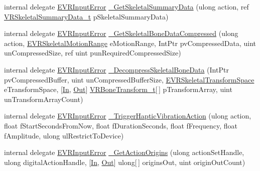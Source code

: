 \begin{DoxyCompactItemize}
\item 
internal delegate \mbox{\hyperlink{namespace_valve_1_1_v_r_a592d7f4189b8346d6c96dbdbaa35bc1b}{E\+V\+R\+Input\+Error}} \mbox{\hyperlink{struct_valve_1_1_v_r_1_1_i_v_r_input_ae852c5f41c5b1d36119e74ee6dbad779}{\+\_\+\+Get\+Skeletal\+Summary\+Data}} (ulong action, ref \mbox{\hyperlink{struct_valve_1_1_v_r_1_1_v_r_skeletal_summary_data__t}{V\+R\+Skeletal\+Summary\+Data\+\_\+t}} p\+Skeletal\+Summary\+Data)
\item 
internal delegate \mbox{\hyperlink{namespace_valve_1_1_v_r_a592d7f4189b8346d6c96dbdbaa35bc1b}{E\+V\+R\+Input\+Error}} \mbox{\hyperlink{struct_valve_1_1_v_r_1_1_i_v_r_input_ac9cf8a486d0d66c088c2eb33b722111d}{\+\_\+\+Get\+Skeletal\+Bone\+Data\+Compressed}} (ulong action, \mbox{\hyperlink{namespace_valve_1_1_v_r_affc8d18345f8f5d36f1ae7b4ce534500}{E\+V\+R\+Skeletal\+Motion\+Range}} e\+Motion\+Range, Int\+Ptr pv\+Compressed\+Data, uint un\+Compressed\+Size, ref uint pun\+Required\+Compressed\+Size)
\item 
internal delegate \mbox{\hyperlink{namespace_valve_1_1_v_r_a592d7f4189b8346d6c96dbdbaa35bc1b}{E\+V\+R\+Input\+Error}} \mbox{\hyperlink{struct_valve_1_1_v_r_1_1_i_v_r_input_ae399aa93e9fa3f84762ce5e124b7c6fb}{\+\_\+\+Decompress\+Skeletal\+Bone\+Data}} (Int\+Ptr pv\+Compressed\+Buffer, uint un\+Compressed\+Buffer\+Size, \mbox{\hyperlink{namespace_valve_1_1_v_r_a916744fb3fc7b8e8ba224fba9bee6de4}{E\+V\+R\+Skeletal\+Transform\+Space}} e\+Transform\+Space, \mbox{[}\mbox{\hyperlink{namespace_valve_1_1_v_r_a1e6192cb5ddaf204afab87ccb5728780aefeb369cccbd560588a756610865664c}{In}}, \mbox{\hyperlink{namespace_valve_1_1_v_r_a1e6192cb5ddaf204afab87ccb5728780a7c147cda9e49590f6abe83d118b7353b}{Out}}\mbox{]} \mbox{\hyperlink{struct_valve_1_1_v_r_1_1_v_r_bone_transform__t}{V\+R\+Bone\+Transform\+\_\+t}}\mbox{[}$\,$\mbox{]} p\+Transform\+Array, uint un\+Transform\+Array\+Count)
\item 
internal delegate \mbox{\hyperlink{namespace_valve_1_1_v_r_a592d7f4189b8346d6c96dbdbaa35bc1b}{E\+V\+R\+Input\+Error}} \mbox{\hyperlink{struct_valve_1_1_v_r_1_1_i_v_r_input_acccca4f15062478fdac76cc1e1a95ec5}{\+\_\+\+Trigger\+Haptic\+Vibration\+Action}} (ulong action, float f\+Start\+Seconds\+From\+Now, float f\+Duration\+Seconds, float f\+Frequency, float f\+Amplitude, ulong ul\+Restrict\+To\+Device)
\item 
internal delegate \mbox{\hyperlink{namespace_valve_1_1_v_r_a592d7f4189b8346d6c96dbdbaa35bc1b}{E\+V\+R\+Input\+Error}} \mbox{\hyperlink{struct_valve_1_1_v_r_1_1_i_v_r_input_a07748e313f1d66ea8b3455c15b5a35fe}{\+\_\+\+Get\+Action\+Origins}} (ulong action\+Set\+Handle, ulong digital\+Action\+Handle, \mbox{[}\mbox{\hyperlink{namespace_valve_1_1_v_r_a1e6192cb5ddaf204afab87ccb5728780aefeb369cccbd560588a756610865664c}{In}}, \mbox{\hyperlink{namespace_valve_1_1_v_r_a1e6192cb5ddaf204afab87ccb5728780a7c147cda9e49590f6abe83d118b7353b}{Out}}\mbox{]} ulong\mbox{[}$\,$\mbox{]} origins\+Out, uint origin\+Out\+Count)

\end{DoxyCompactItemize}
